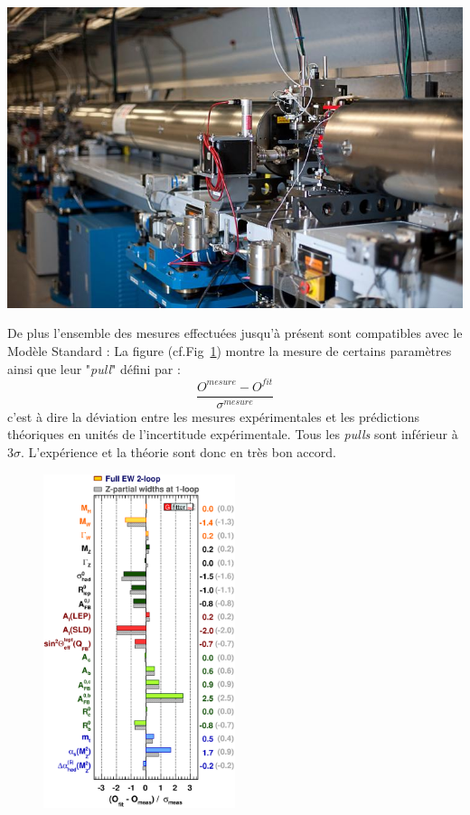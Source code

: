 \marginpar
{
	\centering
	\includegraphics[width=\marginparwidth]{SM/slac.jpg}
	\label{SLAC}
}

De plus l'ensemble des mesures effectuées jusqu'à présent sont compatibles avec le Modèle Standard : La figure (cf.Fig~\ref{mesures}) montre la mesure de certains paramètres ainsi que leur "\textit{pull}" défini par :
\begin{equation}
\frac{O^{mesure}-O^{fit}}{\sigma^{mesure}}
\end{equation}
c'est à dire la déviation entre les mesures expérimentales et les prédictions théoriques en unités de l'incertitude expérimentale. Tous les \textit{pulls} sont inférieur à \num{3}$\sigma$. L'expérience et la théorie sont donc en très bon accord.

\begin{figure}[ht!]
\centering
\includegraphics[width=0.50\textwidth]{SM/mesure.eps}
\label{mesures}
\end{figure}

